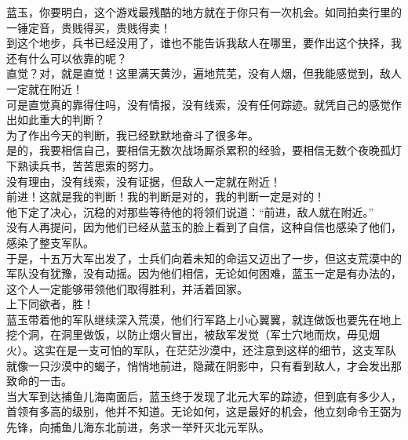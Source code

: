 \begin{multicols}{\theparacolNo}
蓝玉，你要明白，这个游戏最残酷的地方就在于你只有一次机会。如同拍卖行里的一锤定音，贵贱得买，贵贱得卖！\\

到这个地步，兵书已经没用了，谁也不能告诉我敌人在哪里，要作出这个抉择，我还有什么可以依靠的呢？\\

直觉？对，就是直觉！这里满天黄沙，遍地荒芜，没有人烟，但我能感觉到，敌人一定就在附近！\\

可是直觉真的靠得住吗，没有情报，没有线索，没有任何踪迹。就凭自己的感觉作出如此重大的判断？\\

为了作出今天的判断，我已经默默地奋斗了很多年。\\

是的，我要相信自己，要相信无数次战场厮杀累积的经验，要相信无数个夜晚孤灯下熟读兵书，苦苦思索的努力。\\

没有理由，没有线索，没有证据，但敌人一定就在附近！\\

前进！这就是我的判断！我的判断是对的，我的判断一定是对的！\\

他下定了决心，沉稳的对那些等待他的将领们说道：“前进，敌人就在附近。”\\

没有人再提问，因为他们已经从蓝玉的脸上看到了自信，这种自信也感染了他们，感染了整支军队。\\

于是，十五万大军出发了，士兵们向着未知的命运又迈出了一步，但这支荒漠中的军队没有犹豫，没有动摇。因为他们相信，无论如何困难，蓝玉一定是有办法的，这个人一定能够带领他们取得胜利，并活着回家。\\

上下同欲者，胜！\\

蓝玉带着他的军队继续深入荒漠，他们行军路上小心翼翼，就连做饭也要先在地上挖个洞，在洞里做饭，以防止烟火冒出，被敌军发觉（军士穴地而炊，毋见烟火）。这实在是一支可怕的军队，在茫茫沙漠中，还注意到这样的细节，这支军队就像一只沙漠中的蝎子，悄悄地前进，隐藏在阴影中，只有看到敌人，才会发出那致命的一击。\\

当大军到达捕鱼儿海南面后，蓝玉终于发现了北元大军的踪迹，但到底有多少人，首领有多高的级别，他并不知道。无论如何，这是最好的机会，他立刻命令王弼为先锋，向捕鱼儿海东北前进，务求一举歼灭北元军队。\\


\end{multicols}
